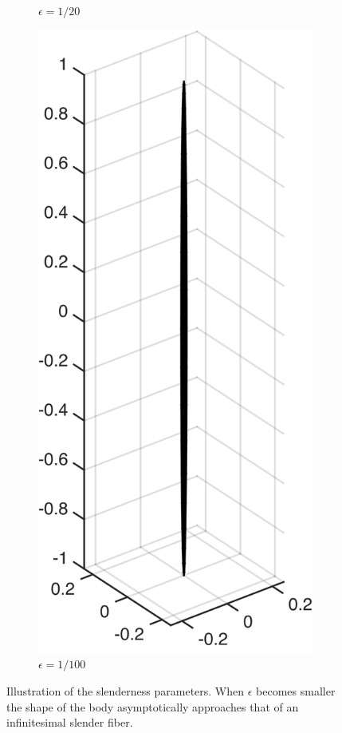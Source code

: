 \begin{figure}[!htbp]
\begin{subfigure}[h]{0.24\textwidth}
    \caption{$\epsilon=1/20$}\label{fig:slenderness_1_20}
  \end{subfigure}
  \begin{subfigure}[h]{0.24\textwidth}
    \centering
    \includegraphics[width=\textwidth]{img/slender/1_100.png}
    \caption{$\epsilon=1/100$}\label{fig:slenderness_1_100}
  \end{subfigure}
  \caption[Illustration of the slenderness parameters.]{Illustration of the slenderness parameters. When $\epsilon$ becomes smaller the shape of the body asymptotically approaches that of an infinitesimal slender fiber.}
  \label{fig:slenderness}
\end{figure}

